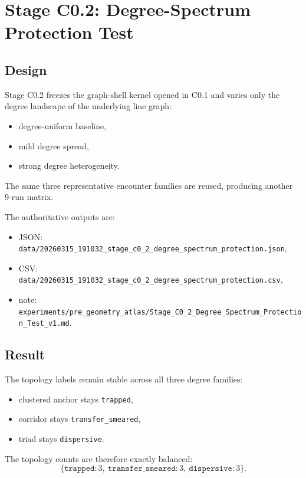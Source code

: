 \documentclass[11pt]{article}
\begin{document}
\section{Stage C0.2: Degree-Spectrum Protection Test}

\subsection{Design}

Stage C0.2 freezes the graph-shell kernel opened in C0.1 and varies only the degree landscape of the underlying line graph:
\begin{itemize}
\item degree-uniform baseline,
\item mild degree spread,
\item strong degree heterogeneity.
\end{itemize}
The same three representative encounter families are reused, producing another 9-run matrix.

The authoritative outputs are:
\begin{itemize}
\item JSON: \texttt{data/20260315\_191032\_stage\_c0\_2\_degree\_spectrum\_protection.json},
\item CSV: \texttt{data/20260315\_191032\_stage\_c0\_2\_degree\_spectrum\_protection.csv},
\item note: \texttt{experiments/pre\_geometry\_atlas/Stage\_C0\_2\_Degree\_Spectrum\_Protection\_Test\_v1.md}.
\end{itemize}

\subsection{Result}

The topology labels remain stable across all three degree families:
\begin{itemize}
\item clustered anchor stays \texttt{trapped},
\item corridor stays \texttt{transfer\_smeared},
\item triad stays \texttt{dispersive}.
\end{itemize}
The topology counts are therefore exactly balanced:
\begin{equation}
\{\texttt{trapped}:3,\ \texttt{transfer\_smeared}:3,\ \texttt{dispersive}:3\}.
\end{equation}
\end{document}
